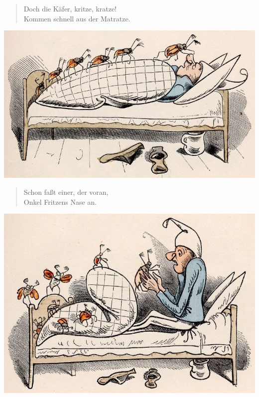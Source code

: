 \documentclass[a4paper,12pt]{article}
\begin{document}
\begin{verse}
Doch die Käfer, kritze, kratze!\\{}
Kommen schnell aus der Matratze.
\end{verse}



\begin{center}\includegraphics[scale=.7, alt={... kommen}]{images/5-08.jpg}\end{center}



\begin{verse}
Schon faßt einer, der voran,\\{}
Onkel Fritzens Nase an.
\end{verse}



\begin{center}\includegraphics[scale=.7, alt={und werden erfasst}]{images/5-09.jpg}\end{center}
\end{document}
